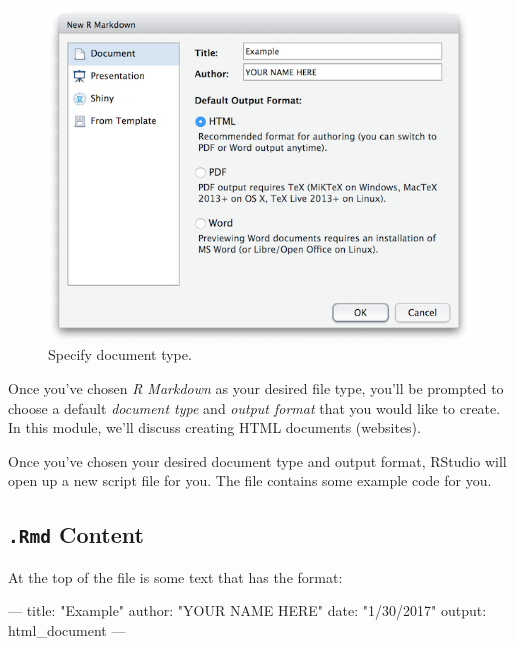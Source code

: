 \documentclass[]{book}
\newenvironment{Shaded}{\begin{snugshade}}{\end{snugshade}}
\newcommand{\StringTok}[1]{\textcolor[rgb]{0.31,0.60,0.02}{#1}}
\newcommand{\OtherTok}[1]{\textcolor[rgb]{0.56,0.35,0.01}{#1}}
\newcommand{\FunctionTok}[1]{\textcolor[rgb]{0.00,0.00,0.00}{#1}}
\newcommand{\AttributeTok}[1]{\textcolor[rgb]{0.77,0.63,0.00}{#1}}
\theoremstyle{definition}
\theoremstyle{definition}
\theoremstyle{remark}
\begin{document}
\begin{figure}
\centering
\includegraphics{img/r-markdown/document-type.png}
\caption{Specify document type.}
\end{figure}

Once you've chosen \emph{R Markdown} as your desired file type, you'll
be prompted to choose a default \emph{document type} and \emph{output
format} that you would like to create. In this module, we'll discuss
creating HTML documents (websites).

Once you've chosen your desired document type and output format, RStudio
will open up a new script file for you. The file contains some example
code for you.

\subsection{\texorpdfstring{\texttt{.Rmd}
Content}{.Rmd Content}}\label{rmd-content}

At the top of the file is some text that has the format:

\begin{Shaded}
\begin{Highlighting}[]
\OtherTok{---}
\FunctionTok{title:}\AttributeTok{ }\StringTok{"Example"}
\FunctionTok{author:}\AttributeTok{ }\StringTok{"YOUR NAME HERE"}
\FunctionTok{date:}\AttributeTok{ }\StringTok{"1/30/2017"}
\FunctionTok{output:}\AttributeTok{ html_document}
\OtherTok{---}
\end{Highlighting}
\end{Shaded}
\end{document}
